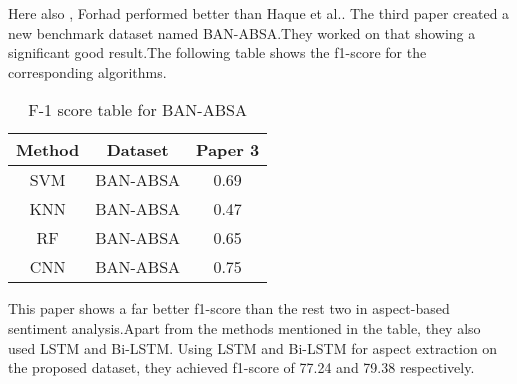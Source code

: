 \documentclass[a4paper,12pt]{article}
\begin{document}
Here also , Forhad\cite{first} performed better than Haque et al.\cite{second}.\newline
The third paper created a new benchmark dataset named BAN-ABSA\cite{third}.They worked on that showing a significant good result.The following table shows the f1-score for the corresponding algorithms.
\begin{table}[h!]
    \centering
    \begin{tabular}{|c|c|c|}
        \hline
        \textbf{Method} & \textbf{Dataset} & \textbf{Paper 3} \\
        \hline
         SVM & BAN-ABSA & 0.69\\
        \hline
        KNN & BAN-ABSA & 0.47 \\
        \hline
        RF & BAN-ABSA & 0.65 \\
        \hline
        CNN & BAN-ABSA & 0.75 \\
        \hline
    \end{tabular}
    \caption{F-1 score table for BAN-ABSA}
    \label{tab:example}
\end{table}
This paper shows a far better f1-score than the rest two in aspect-based sentiment analysis.Apart from the methods mentioned in the table, they also used LSTM and Bi-LSTM.\newline
Using LSTM and  Bi-LSTM for aspect extraction on the proposed dataset, they achieved f1-score of 77.24 and 79.38 respectively. 
\end{document}
